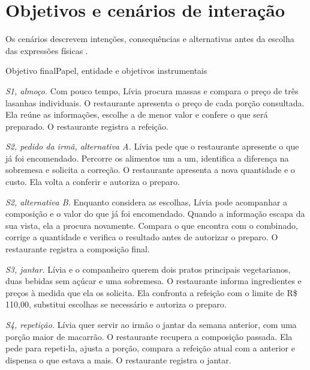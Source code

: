 \section{Objetivos e cenários de interação}
Os cenários descrevem intenções, consequências e alternativas antes da escolha das expressões físicas \cite{rosson}.
\begin{uxtable}{Objetivo final}{Papel, entidade e objetivos instrumentais}
\end{uxtable}
\textit{S1, almoço.} Com pouco tempo, Lívia procura massas e compara o preço de três lasanhas individuais. O restaurante apresenta o preço de cada porção consultada. Ela reúne as informações, escolhe a de menor valor e confere o que será preparado. O restaurante registra a refeição.
\par\textit{S2, pedido da irmã, alternativa A.} Lívia pede que o restaurante apresente o que já foi encomendado. Percorre os alimentos um a um, identifica a diferença na sobremesa e solicita a correção. O restaurante apresenta a nova quantidade e o custo. Ela volta a conferir e autoriza o preparo.
\par\textit{S2, alternativa B.} Enquanto considera as escolhas, Lívia pode acompanhar a composição e o valor do que já foi encomendado. Quando a informação escapa da sua vista, ela a procura novamente. Compara o que encontra com o combinado, corrige a quantidade e verifica o resultado antes de autorizar o preparo. O restaurante registra a composição final.
\par\textit{S3, jantar.} Lívia e o companheiro querem dois pratos principais vegetarianos, duas bebidas sem açúcar e uma sobremesa. O restaurante informa ingredientes e preços à medida que ela os solicita. Ela confronta a refeição com o limite de R\$\,110,00, substitui escolhas se necessário e autoriza o preparo.
\par\textit{S4, repetição.} Lívia quer servir ao irmão o jantar da semana anterior, com uma porção maior de macarrão. O restaurante recupera a composição passada. Ela pede para repeti-la, ajusta a porção, compara a refeição atual com a anterior e dispensa o que estava a mais. O restaurante registra o jantar.
